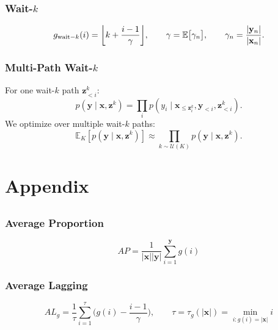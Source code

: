 \documentclass[landscape]{article}
\DeclarePairedDelimiter\floor{\lfloor}{\rfloor}
\begin{document}
\subsubsection*{Wait-$k$}
\begin{equation}\nonumber
	g_{\text{wait}-k}(i) = \floor*{k+\frac{i-1}{\gamma}}, \qquad	\gamma=\mathbb{E}\big[\gamma_n\big], 	\qquad \gamma_n = \frac{|\mathbf{y}_n|}{| \mathbf{x}_n|}.
\end{equation}

\subsubsection*{Multi-Path Wait-$k$}
For one  wait-$k$ path $\mathbf{z}_{<i}^k$:
\begin{equation}\nonumber
p(\mathbf{y} \mid \mathbf{x}, \mathbf{z}^k) = \prod_i p(y_i \mid \mathbf{x}_{\leq \mathbf{z}_i^k}, \mathbf{y}_{<i}, \mathbf{z}_{<i}^k).
\end{equation}\nonumber
We optimize over multiple wait-$k$ paths:
\begin{equation}\nonumber
\mathbb{E}_K[p(\mathbf{y} \mid \mathbf{x}, \mathbf{z}^k)] \approx \prod_{k \sim \mathcal{U}(K)} p(\mathbf{y} \mid \mathbf{x}, \mathbf{z}^k).
\end{equation}


\cp
\thispagestyle{empty}
\section*{Appendix}
\vspace*{10mm}
\subsection*{}
\vspace*{5mm}
\subsubsection*{Average Proportion}
\begin{equation}\nonumber
	AP = \frac{1}{|\mathbf{x}| |\mathbf{y}|} \sum_{i=1}^{\mathbf{y}} g(i)
\end{equation}

\subsubsection*{Average Lagging}
\begin{equation}\nonumber
	AL_g = \frac{1}{\tau} \sum_{i=1}^{\tau} \bigg(g(i) - \frac{i - 1}{\gamma}\bigg), \qquad \tau = \tau_g(| \mathbf{x} |) = \min_{i : g(i) = |\mathbf{x}|} i
\end{equation}
\end{document}
